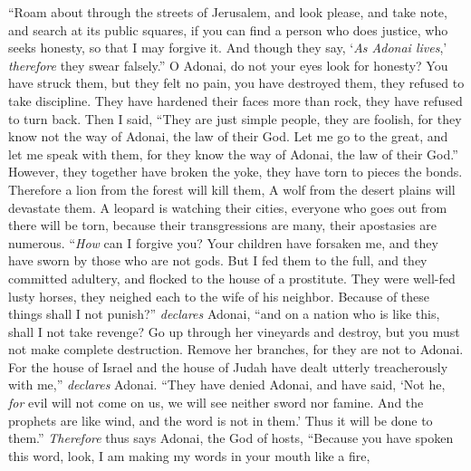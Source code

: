 \begin{biblechapter} %
\verse “Roam about through the streets of Jerusalem, 
and look please, and take note, 
and search at its public squares, 
if you can find a person who does justice, 
who seeks honesty, 
so that I may forgive it.
\verse And though they say, ‘\textit{As Adonai lives},’ 
\textit{therefore} they swear falsely.”
\verse O Adonai, do not your eyes look for honesty? 
You have struck them, but they felt no pain, 
you have destroyed them, they refused to take discipline. 
They have hardened their faces more than rock, 
they have refused to turn back.
\verse Then I said, “They are just simple people, 
they are foolish, 
for they know not the way of Adonai, 
the law of their God.
\verse Let me go to the great, 
and let me speak with them, 
for they know the way of Adonai, 
the law of their God.” 
However, they together have broken the yoke, 
they have torn to pieces the bonds.
\verse Therefore a lion from the forest will kill them, 
A wolf from the desert plains will devastate them. 
A leopard is watching their cities, 
everyone who goes out from there will be torn, 
because their transgressions are many, 
their apostasies are numerous.
\verse “\textit{How} can I forgive you? 
Your children have forsaken me, 
and they have sworn by those who are not gods. 
But I fed them to the full, 
and they committed adultery, 
and flocked to the house of a prostitute.
\verse They were well-fed lusty horses, 
they neighed each to the wife of his neighbor.
\verse Because of these things shall I not punish?” \textit{declares} Adonai, 
“and on a nation who is like this, shall I not take revenge?
\verse Go up through her vineyards and destroy, 
but you must not make complete destruction. 
Remove her branches, 
for they are not to Adonai.
\verse For the house of Israel and the house of Judah 
have dealt utterly treacherously with me,” \textit{declares} Adonai.
\verse “They have denied Adonai, and have said, 
‘Not he, \textit{for} evil will not come on us, 
we will see neither sword nor famine.
\verse And the prophets are like wind, 
and the word is not in them.’ 
Thus it will be done to them.”
\verse \textit{Therefore} thus says Adonai, the God of hosts, 
“Because you have spoken this word, 
look, I am making my words in your mouth like a fire, 

\end{biblechapter}
